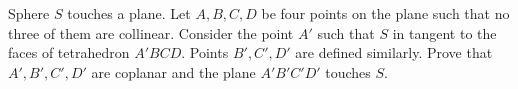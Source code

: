 Sphere $S$ touches a plane. Let $A,B,C,D$ be four points on the plane such that no three of them are collinear. Consider the point $A'$ such that $S$ in tangent to the faces of tetrahedron $A'BCD$. Points $B',C',D'$ are defined similarly. Prove that $A',B',C',D'$ are coplanar and the plane $A'B'C'D'$ touches $S$.